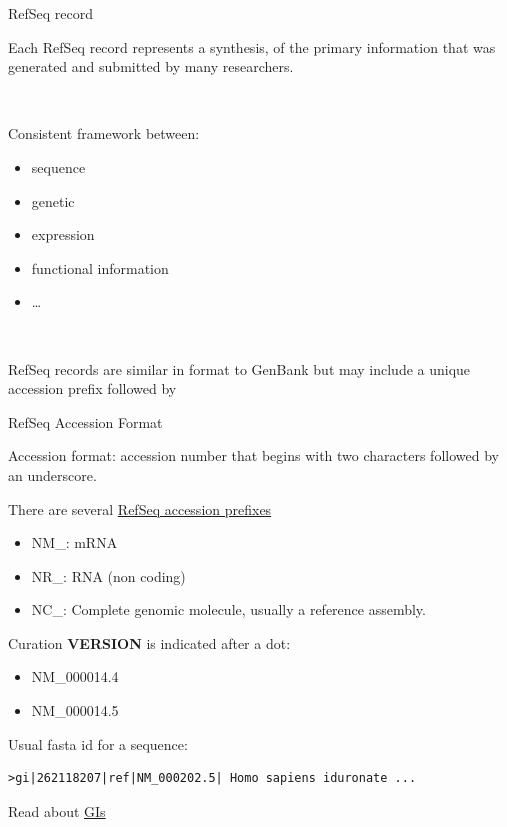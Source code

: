 \begin{frame}{RefSeq record}

Each RefSeq record represents a synthesis, of the primary information
that was generated and submitted by many researchers.

~

Consistent framework between:

\begin{itemize}
\itemsep1pt\parskip0pt
\item
  sequence
\item
  genetic
\item
  expression
\item
  functional information
\item
  \ldots{}
\end{itemize}

~

RefSeq records are similar in format to GenBank but may include a unique
accession prefix followed by

\end{frame}

\begin{frame}[fragile]{RefSeq Accession Format}

Accession format: accession number that begins with two characters
followed by an underscore.

There are several
\href{http://www.ncbi.nlm.nih.gov/books/NBK21091/table/ch18.T.refseq_accession_numbers_and_mole/?report=objectonly}{RefSeq
accession prefixes}

\begin{itemize}
\itemsep1pt\parskip0pt
\item
  NM\_: mRNA\\
\item
  NR\_: RNA (non coding)
\item
  NC\_: Complete genomic molecule, usually a reference assembly.
\end{itemize}

Curation \textbf{VERSION} is indicated after a dot:

\begin{itemize}
\itemsep1pt\parskip0pt
\item
  NM\_000014.4
\item
  NM\_000014.5
\end{itemize}

Usual fasta id for a sequence:

\begin{verbatim}
>gi|262118207|ref|NM_000202.5| Homo sapiens iduronate ...
\end{verbatim}

Read about
\href{http://www.ncbi.nlm.nih.gov/nuccore/NM_002020.4?report=girevhist}{GIs}

\end{frame}

